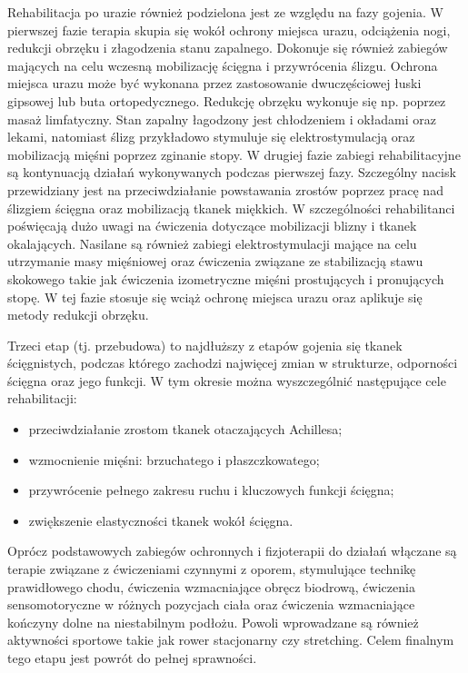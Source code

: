Rehabilitacja po urazie również podzielona jest ze względu na fazy gojenia. \linebreak W pierwszej fazie terapia skupia się wokół ochrony miejsca urazu, odciążenia nogi, redukcji obrzęku i złagodzenia stanu zapalnego. Dokonuje się również zabiegów mających na celu wczesną mobilizację ścięgna i przywrócenia ślizgu. Ochrona miejsca urazu może być wykonana przez zastosowanie dwuczęściowej łuski gipsowej lub buta ortopedycznego. Redukcję obrzęku wykonuje się np. poprzez masaż limfatyczny. Stan zapalny łagodzony jest chłodzeniem i okładami oraz lekami, natomiast ślizg przykładowo stymuluje się elektrostymulacją oraz mobilizacją mięśni poprzez zginanie stopy.
\newpage
W drugiej fazie zabiegi rehabilitacyjne są kontynuacją działań wykonywanych podczas pierwszej fazy. Szczególny nacisk przewidziany jest na przeciwdziałanie powstawania zrostów poprzez pracę nad ślizgiem ścięgna oraz mobilizacją tkanek miękkich. W szczególności rehabilitanci poświęcają dużo uwagi na ćwiczenia dotyczące mobilizacji blizny i tkanek okalających. Nasilane są również zabiegi elektrostymulacji mające na celu utrzymanie masy mięśniowej oraz ćwiczenia związane ze stabilizacją stawu skokowego takie jak ćwiczenia izometryczne mięśni prostujących i pronujących stopę. W tej fazie stosuje się wciąż ochronę miejsca urazu oraz aplikuje się metody redukcji obrzęku.

Trzeci etap (tj. przebudowa) to najdłuższy z etapów gojenia się tkanek ścięgnistych, podczas którego zachodzi najwięcej zmian w strukturze, odporności ścięgna oraz jego funkcji. W tym okresie można wyszczególnić następujące cele rehabilitacji: 
\begin{itemize}[noitemsep,nolistsep]
	\item przeciwdziałanie zrostom tkanek otaczających Achillesa; 
	\item wzmocnienie mięśni: brzuchatego i płaszczkowatego; 
	\item przywrócenie pełnego zakresu ruchu i kluczowych funkcji ścięgna; 
	\item zwiększenie elastyczności tkanek wokół ścięgna.
\end{itemize}

Oprócz podstawowych zabiegów ochronnych i fizjoterapii do działań włączane \linebreak są terapie związane z ćwiczeniami czynnymi z oporem, stymulujące technikę prawidłowego chodu, ćwiczenia wzmacniające obręcz biodrową, ćwiczenia sensomotoryczne w różnych pozycjach ciała oraz ćwiczenia wzmacniające kończyny dolne na niestabilnym podłożu. Powoli wprowadzane są również aktywności sportowe takie jak rower stacjonarny czy stretching. Celem finalnym tego etapu jest powrót \linebreak do pełnej sprawności. 

